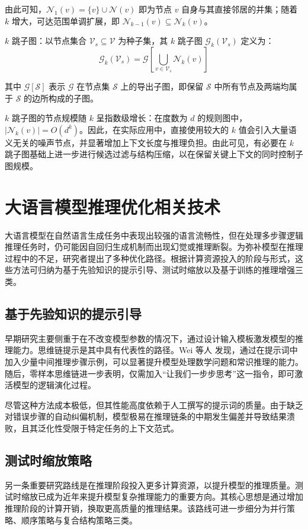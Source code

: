 \documentclass[promaster, vlined]{DissertUESTC}
\begin{document}
由此可知，$\mathcal{N}_1(v) = \{v\} \cup \mathcal{N}(v)$ 即为节点 $v$ 自身与其直接邻居的并集；随着 $k$ 增大，可达范围单调扩展，即 $\mathcal{N}_{k-1}(v) \subseteq \mathcal{N}_k(v)$。

$k$ 跳子图：以节点集合 $\mathcal{V}_s \subseteq \mathcal{V}$ 为种子集，其 $k$ 跳子图 $\mathcal{G}_k(\mathcal{V}_s)$ 定义为：
\begin{equation}
\mathcal{G}_k(\mathcal{V}_s) = \mathcal{G}\!\left[\bigcup_{v \in \mathcal{V}_s} \mathcal{N}_k(v)\right]
\end{equation}

其中 $\mathcal{G}[\mathcal{S}]$ 表示 $\mathcal{G}$ 在节点集 $\mathcal{S}$ 上的导出子图，即保留 $\mathcal{S}$ 中所有节点及两端均属于 $\mathcal{S}$ 的边所构成的子图。

$k$ 跳子图的节点规模随 $k$ 呈指数级增长：在度数为 $d$ 的规则图中，$|\mathcal{N}_k(v)| = O(d^k)$。因此，在实际应用中，直接使用较大的 $k$ 值会引入大量语义无关的噪声节点，并显著增加上下文长度与推理负担。由此可见，有必要在 $k$ 跳子图基础上进一步进行候选过滤与结构压缩，以在保留关键上下文的同时控制子图规模。


\section{大语言模型推理优化相关技术}

大语言模型在自然语言生成任务中表现出较强的语言流畅性，但在处理多步骤逻辑推理任务时，仍可能因自回归生成机制而出现幻觉或推理断裂。为弥补模型在推理过程中的不足，研究者提出了多种优化路径。根据计算资源投入的阶段与形式，这些方法可归纳为基于先验知识的提示引导、测试时缩放以及基于训练的推理增强三类。
\subsection{基于先验知识的提示引导}
早期研究主要侧重于在不改变模型参数的情况下，通过设计输入模板激发模型的推理能力。思维链提示是其中具有代表性的路径。Wei 等人 \cite{wei2022chain} 发现，通过在提示词中加入少量中间推理步骤示例，可以显著提升模型处理数学问题和常识推理的能力。随后，零样本思维链\cite{kojima2022large}进一步表明，仅需加入“让我们一步步思考”这一指令，即可激活模型的逻辑演化过程。

尽管这种方法成本极低，但其性能高度依赖于人工撰写的提示词的质量。由于缺乏对错误步骤的自动纠偏机制，模型极易在推理链条的中期发生偏差并导致结果溃败，且其泛化性受限于特定任务的上下文范式。

\subsection{测试时缩放策略}
另一条重要研究路线是在推理阶段投入更多计算资源，以提升模型的推理质量。测试时缩放已成为近年来提升模型复杂推理能力的重要方向。其核心思想是通过增加推理阶段的计算开销，换取更高质量的推理结果。该路线可进一步细分为并行策略、顺序策略与复合结构策略三类。
\end{document}
